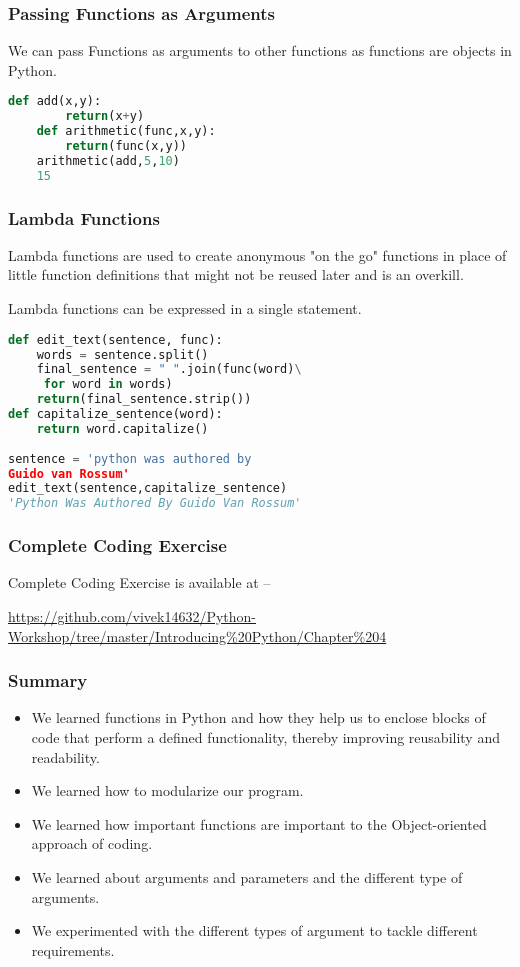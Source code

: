 \documentclass{beamer}
\begin{document}
\begin{frame}[fragile]
\frametitle{Passing Functions as Arguments}
We can pass Functions as arguments to other functions as functions are objects in Python.
\begin{lstlisting}[language=Python]
	def add(x,y):
		return(x+y)
	def arithmetic(func,x,y):
		return(func(x,y))
	arithmetic(add,5,10)
	15
\end{lstlisting}
\end{frame}

\begin{frame}[fragile]
\frametitle{Lambda Functions}
Lambda functions are used to create anonymous "on the go" functions in place of little function definitions that might not be reused later and is an overkill.

Lambda functions can be expressed in a single statement.
\begin{lstlisting}[language=Python]
def edit_text(sentence, func):
    words = sentence.split()
    final_sentence = " ".join(func(word)\
     for word in words)
    return(final_sentence.strip())  
def capitalize_sentence(word):
    return word.capitalize()
    
sentence = 'python was authored by 
Guido van Rossum'
edit_text(sentence,capitalize_sentence)
'Python Was Authored By Guido Van Rossum'
\end{lstlisting}
\end{frame}

\begin{frame}
\frametitle{Complete Coding Exercise}
Complete Coding Exercise is available at --
 
\url{https://github.com/vivek14632/Python-Workshop/tree/master/Introducing\%20Python/Chapter\%204}
\end{frame}


\begin{frame}
\frametitle{Summary}
\begin{itemize}
\item We learned functions  in Python and how they help us to enclose blocks of code that perform a defined functionality, thereby improving reusability and readability.
\item We learned how to modularize our program.
\item We learned how important functions are important to the Object-oriented approach of coding.
\item We learned about arguments and parameters and the different type of arguments.
\item We experimented with the different types of argument to tackle different requirements.
\end{itemize}
\end{frame}
\end{document}
